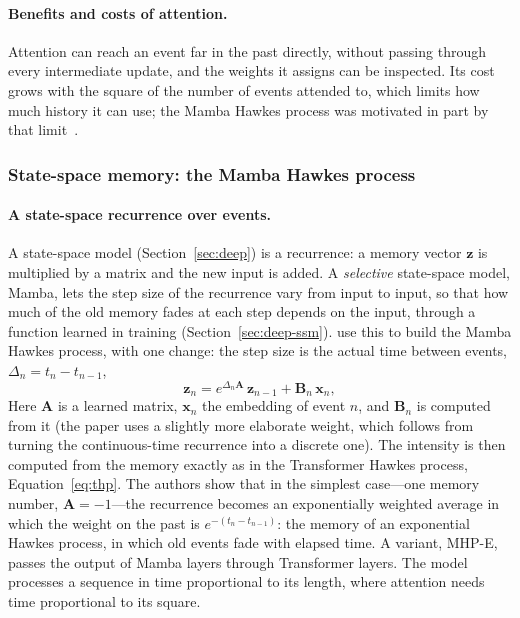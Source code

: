 \paragraph{Benefits and costs of attention.} Attention can reach an event far in the past directly, without
passing through every intermediate update, and the weights it assigns can be inspected. Its cost grows with the
square of the number of events attended to, which limits how much history it can use; the Mamba Hawkes process
was motivated in part by that limit~\citep{gao2024mhp}.

\subsubsection{State-space memory: the Mamba Hawkes process}
\label{sec:npp-mamba}

\paragraph{A state-space recurrence over events.} A state-space model (Section~\ref{sec:deep}) is a recurrence: a memory vector $\mathbf{z}$ is
multiplied by a matrix and the new input is added. A \emph{selective} state-space model, Mamba, lets the step size
of the recurrence vary from input to input, so that how much of the old memory fades at each step depends on the
input, through a function learned in training (Section~\ref{sec:deep-ssm}).
\citet{gao2024mhp} use this to build the Mamba Hawkes process, with one change: the step size is the actual time
between events, $\Delta_n = t_n - t_{n-1}$,
\begin{equation}
\mathbf{z}_n = e^{\Delta_n \mathbf{A}}\,\mathbf{z}_{n-1} + \mathbf{B}_n\,\mathbf{x}_n,
\label{eq:mhp}
\end{equation}
Here $\mathbf{A}$ is a learned matrix, $\mathbf{x}_n$ the embedding of event $n$, and $\mathbf{B}_n$ is computed
from it (the paper uses a slightly more elaborate weight, which follows from turning the continuous-time recurrence
into a discrete one). The intensity is then computed from the memory exactly as in the Transformer Hawkes process,
Equation~\eqref{eq:thp}. The authors show that in the simplest case---one memory number, $\mathbf{A} = -1$---the
recurrence becomes an exponentially weighted average in which the weight on the past is
$e^{-(t_n - t_{n-1})}$: the memory of an exponential Hawkes process, in which old events fade with elapsed time. A
variant, MHP-E, passes the output of Mamba layers through Transformer layers. The model processes a sequence in time
proportional to its length, where attention needs time proportional to its square.

